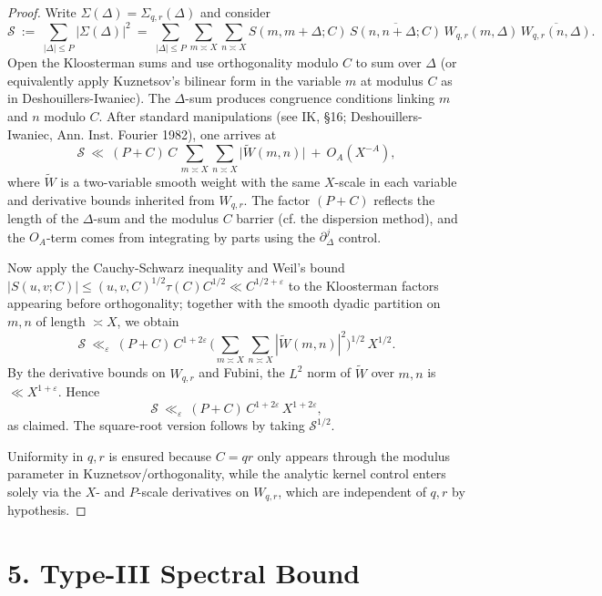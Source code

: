 \documentclass[11pt]{article}
\theoremstyle{definition}
\theoremstyle{remark}
\begin{document}
\begin{proof}
	Write $\Sigma(\Delta)=\Sigma_{q,r}(\Delta)$ and consider
	\[
		\mathcal S\ :=\ \sum_{|\Delta|\le P}\big|\Sigma(\Delta)\big|^2
		\ =\ \sum_{|\Delta|\le P}\sum_{m\asymp X}\sum_{n\asymp X} S(m,m+\Delta;C)\,\overline{S(n,n+\Delta;C)}\,W_{q,r}(m,\Delta)\,\overline{W_{q,r}(n,\Delta)}.
	\]
	Open the Kloosterman sums and use orthogonality modulo $C$ to sum over $\Delta$ (or equivalently apply Kuznetsov’s bilinear form in the variable $m$ at modulus $C$ as in Deshouillers-Iwaniec). The $\Delta$-sum produces congruence conditions linking $m$ and $n$ modulo $C$. After standard manipulations (see IK, §16; Deshouillers-Iwaniec, Ann. Inst. Fourier 1982), one arrives at
	\[
		\mathcal S\ \ll\ (P+C)\,C\,\sum_{m\asymp X}\sum_{n\asymp X}\big|\widetilde W(m,n)\big|\ +\ O_A(X^{-A}),
	\]
	where $\widetilde W$ is a two-variable smooth weight with the same $X$-scale in each variable and derivative bounds inherited from $W_{q,r}$. The factor $(P+C)$ reflects the length of the $\Delta$-sum and the modulus $C$ barrier (cf. the dispersion method), and the $O_A$-term comes from integrating by parts using the $\partial_\Delta^j$ control.

	Now apply the Cauchy-Schwarz inequality and Weil’s bound $|S(u,v;C)|\le (u,v,C)^{1/2}\tau(C)C^{1/2}\ll C^{1/2+\varepsilon}$ to the Kloosterman factors appearing before orthogonality; together with the smooth dyadic partition on $m,n$ of length $\asymp X$, we obtain
	\[
		\mathcal S\ \ll_{\varepsilon}\ (P+C)\,C^{1+2\varepsilon}\,\Big(\sum_{m\asymp X}\sum_{n\asymp X}|\widetilde W(m,n)|^2\Big)^{1/2}\,X^{1/2}.
	\]
	By the derivative bounds on $W_{q,r}$ and Fubini, the $L^2$ norm of $\widetilde W$ over $m,n$ is $\ll X^{1+\varepsilon}$. Hence
	\[
		\mathcal S\ \ll_{\varepsilon}\ (P+C)\,C^{1+2\varepsilon}\,X^{1+2\varepsilon},
	\]
	as claimed. The square-root version follows by taking $\mathcal S^{1/2}$.

	Uniformity in $q,r$ is ensured because $C=qr$ only appears through the modulus parameter in Kuznetsov/orthogonality, while the analytic kernel control enters solely via the $X$- and $P$-scale derivatives on $W_{q,r}$, which are independent of $q,r$ by hypothesis.
\end{proof}



\section*{5. Type-III Spectral Bound}
\end{document}

